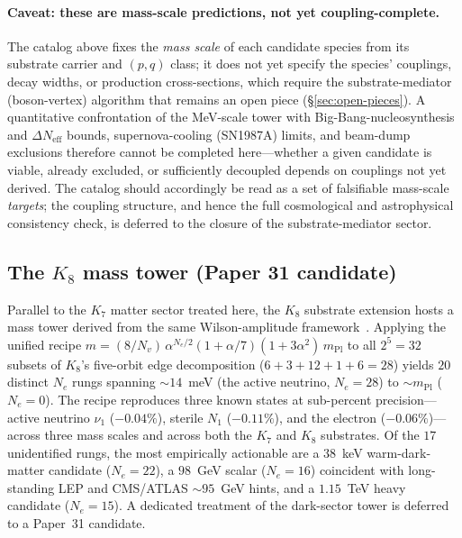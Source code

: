 \documentclass[11pt]{article}
\begin{document}
\paragraph{Caveat: these are mass-scale predictions, not yet coupling-complete.}  The catalog above fixes the \emph{mass scale} of each candidate species from its substrate carrier and $(p, q)$ class; it does not yet specify the species' couplings, decay widths, or production cross-sections, which require the substrate-mediator (boson-vertex) algorithm that remains an open piece (\S\ref{sec:open-pieces}).  A quantitative confrontation of the MeV-scale tower with Big-Bang-nucleosynthesis and $\Delta N_\text{eff}$ bounds, supernova-cooling (SN1987A) limits, and beam-dump exclusions therefore cannot be completed here---whether a given candidate is viable, already excluded, or sufficiently decoupled depends on couplings not yet derived.  The catalog should accordingly be read as a set of falsifiable mass-scale \emph{targets}; the coupling structure, and hence the full cosmological and astrophysical consistency check, is deferred to the closure of the substrate-mediator sector.

\subsection{The $K_8$ mass tower (Paper 31 candidate)}
\label{sec:k8-tower}

Parallel to the $K_7$ matter sector treated here, the $K_8$ substrate extension hosts a mass tower derived from the same Wilson-amplitude framework~\cite{Paper20}.  Applying the unified recipe $m = (8 / N_v)\, \alpha^{N_e / 2} (1 + \alpha/7)(1 + 3\alpha^2)\, m_\text{Pl}$ to all $2^5 = 32$ subsets of $K_8$'s five-orbit edge decomposition ($6 + 3 + 12 + 1 + 6 = 28$) yields $20$ distinct $N_e$ rungs spanning $\sim 14$~meV (the active neutrino, $N_e = 28$) to $\sim m_\text{Pl}$ ($N_e = 0$).  The recipe reproduces three known states at sub-percent precision---active neutrino $\nu_1$ ($-0.04\%$), sterile $N_1$ ($-0.11\%$), and the electron ($-0.06\%$)---across three mass scales and across both the $K_7$ and $K_8$ substrates.  Of the $17$ unidentified rungs, the most empirically actionable are a $38$~keV warm-dark-matter candidate ($N_e = 22$), a $98$~GeV scalar ($N_e = 16$) coincident with long-standing LEP and CMS/ATLAS $\sim 95$~GeV hints, and a $1.15$~TeV heavy candidate ($N_e = 15$).  A dedicated treatment of the dark-sector tower is deferred to a Paper~31 candidate.

\end{document}
